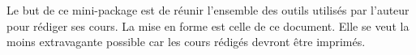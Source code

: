 Le but de ce mini-package est de réunir l'ensemble des outils utilisés par l'auteur pour rédiger ses cours. La mise en forme est celle de ce document. Elle se veut la moins extravagante possible car les cours rédigés devront être imprimés.